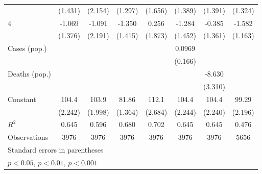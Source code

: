 \documentclass{article}
\begin{document}
{\begin{longtable}{l*{7}{c}}
                &  (1.431)         &  (2.154)         &  (1.297)         &  (1.656)         &  (1.389)         &  (1.391)         &  (1.324)         \\
4               &   -1.069         &   -1.091         &   -1.350         &    0.256         &   -1.284         &   -0.385         &   -1.582         \\
                &  (1.376)         &  (2.191)         &  (1.415)         &  (1.873)         &  (1.452)         &  (1.361)         &  (1.163)         \\
Cases (pop.)    &                  &                  &                  &                  &   0.0969         &                  &                  \\
                &                  &                  &                  &                  &  (0.166)         &                  &                  \\
Deaths (pop.)   &                  &                  &                  &                  &                  &   -8.630\sym{*}  &                  \\
                &                  &                  &                  &                  &                  &  (3.310)         &                  \\
Constant        &    104.4\sym{***}&    103.9\sym{***}&    81.86\sym{***}&    112.1\sym{***}&    104.4\sym{***}&    104.4\sym{***}&    99.29\sym{***}\\
                &  (2.242)         &  (1.998)         &  (1.364)         &  (2.684)         &  (2.244)         &  (2.240)         &  (2.196)         \\
\hline
\(R^{2}\)       &    0.645         &    0.596         &    0.680         &    0.702         &    0.645         &    0.645         &    0.476         \\
Observations    &     3976         &     3976         &     3976         &     3976         &     3976         &     3976         &     5656         \\
\hline\hline
\multicolumn{8}{l}{\footnotesize Standard errors in parentheses}\\
\multicolumn{8}{l}{\footnotesize \sym{*} \(p<0.05\), \sym{**} \(p<0.01\), \sym{***} \(p<0.001\)}\\
\end{longtable}
}
\end{document}
